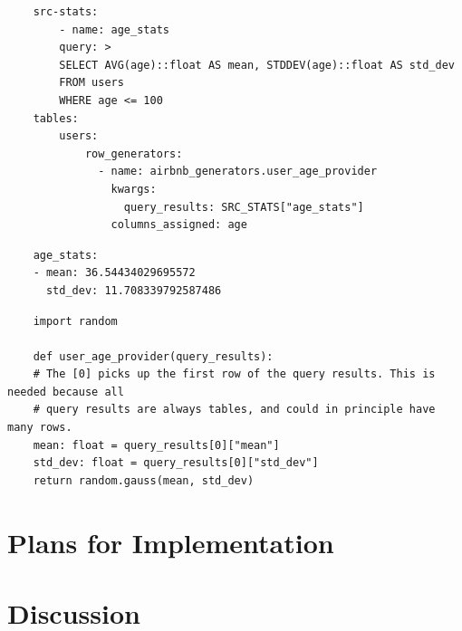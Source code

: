 \documentclass[11pt]{article}
\begin{document}
\begin{verbatim}
    src-stats:
        - name: age_stats
        query: >
        SELECT AVG(age)::float AS mean, STDDEV(age)::float AS std_dev
        FROM users
        WHERE age <= 100
    tables:
        users:
            row_generators:
              - name: airbnb_generators.user_age_provider
                kwargs:
                  query_results: SRC_STATS["age_stats"]
                columns_assigned: age
\end{verbatim}

\begin{verbatim}
    age_stats:
    - mean: 36.54434029695572
      std_dev: 11.708339792587486
\end{verbatim}

\begin{verbatim}
    import random
    
    def user_age_provider(query_results):
    # The [0] picks up the first row of the query results. This is needed because all
    # query results are always tables, and could in principle have many rows.
    mean: float = query_results[0]["mean"]
    std_dev: float = query_results[0]["std_dev"]
    return random.gauss(mean, std_dev)
\end{verbatim}



\section{Plans for Implementation}


\section{Discussion}
\end{document}
